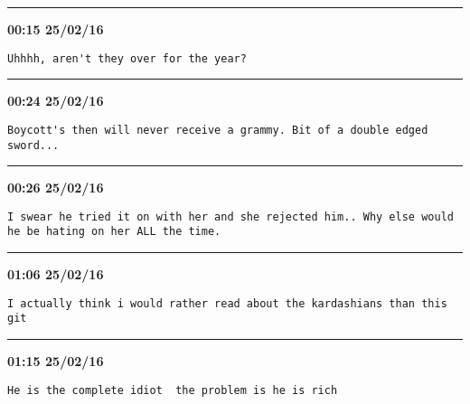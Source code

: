 \hrule%

\begin{adjustwidth}{0cm}{0cm}
\footnotesize \textbf{00:15 25/02/16}

\begin{lstlisting}[breaklines, breakatwhitespace, basicstyle=\small, frame=leftline]
Uhhhh, aren't they over for the year?
\end{lstlisting}
\end{adjustwidth}

\hrule%

\begin{adjustwidth}{0cm}{0cm}
\footnotesize \textbf{00:24 25/02/16}

\begin{lstlisting}[breaklines, breakatwhitespace, basicstyle=\small, frame=leftline]
Boycott's then will never receive a grammy. Bit of a double edged sword...
\end{lstlisting}
\end{adjustwidth}

\hrule%

\begin{adjustwidth}{0cm}{0cm}
\footnotesize \textbf{00:26 25/02/16}

\begin{lstlisting}[breaklines, breakatwhitespace, basicstyle=\small, frame=leftline]
I swear he tried it on with her and she rejected him.. Why else would he be hating on her ALL the time.
\end{lstlisting}
\end{adjustwidth}

\hrule%

\begin{adjustwidth}{0cm}{0cm}
\footnotesize \textbf{01:06 25/02/16}

\begin{lstlisting}[breaklines, breakatwhitespace, basicstyle=\small, frame=leftline]
I actually think i would rather read about the kardashians than this git
\end{lstlisting}
\end{adjustwidth}

\hrule%

\begin{adjustwidth}{0cm}{0cm}
\footnotesize \textbf{01:15 25/02/16}

\begin{lstlisting}[breaklines, breakatwhitespace, basicstyle=\small, frame=leftline]
He is the complete idiot  the problem is he is rich
\end{lstlisting}
\end{adjustwidth}


